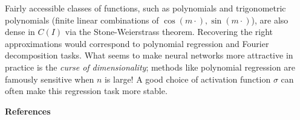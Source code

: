 \documentclass[12pt]{article}
\begin{document}
Fairly accessible classes of functions, such as polynomials and trigonometric
polynomials (finite linear combinations of $\cos(m\cdot), \sin(m\cdot)$), are
also dense in $C(I)$ via the Stone-Weierstrass theorem.
Recovering the right approximations would correspond to polynomial regression
and Fourier decomposition tasks.
What seems to make neural networks more attractive in practice is the
\emph{curse of dimensionality}; methods like polynomial regression are famously
sensitive when $n$ is large!
A good choice of activation function $\sigma$ can often make this regression
task more stable.


\vfill

\nocite{*}


\begingroup
\renewcommand{\section}[2]{}%
\textbf{References}

\endgroup
\end{document}
